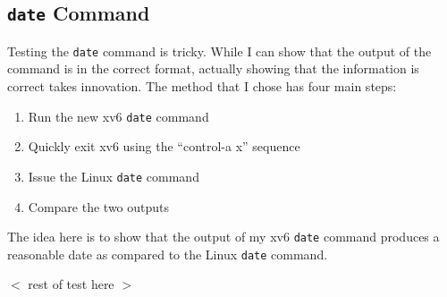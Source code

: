 \documentclass[12pt,letterpaper]{report}
\begin{document}
	\subsection*{\texttt{date} Command}
	Testing the \texttt{date} command is tricky. While I can show that the output of the command is in the correct format, actually showing that the information is correct takes innovation. The method that I chose has four main steps:
	\begin{enumerate}
	\item Run the new xv6 \texttt{date} command
	\item Quickly exit xv6 using the ``control-a x'' sequence
	\item Issue the Linux \texttt{date} command
	\item Compare the two outputs
	\end{enumerate}
	The idea here is to show that the output of my xv6 \texttt{date} command produces a reasonable date as compared to the Linux \texttt{date} command. 
	
	$<$ rest of test here $>$
	
\end{document}
